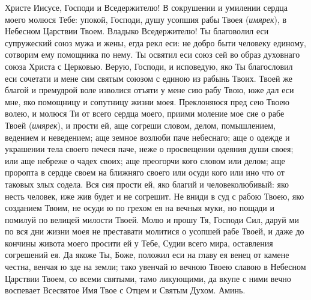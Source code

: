 \begin{mymulticols}
 


Христе Иисусе, Господи и Вседержителю! В сокрушении и умилении сердца моего молюся Тебе: упокой, Господи, душу усопшия рабы Твоея ({\itshape имярек}), в Небесном Царствии Твоем. Владыко Вседержителю! Ты благоволил еси супружеский союз мужа и жены, егда рекл еси: не добро быти человеку единому, сотворим ему помощника по нему. Ты освятил еси союз сей во образ духовнаго союза Христа с Церковью. Верую, Господи, и исповедую, яко Ты благословил еси сочетати и мене сим святым союзом с единою из рабынь Твоих. Твоей же благой и премудрой воле изволися отъяти у мене сию рабу Твою, юже дал еси мне, яко помощницу и сопутницу жизни моея. Преклоняюся пред сею Твоею волею, и молюся Ти от всего сердца моего, приими моление мое сие о рабе Твоей ({\itshape имярек}), и прости ей, аще согреши словом, делом, помышлением, ведением и неведением; аще земное возлюби паче небеснаго; аще о одежде и украшении тела своего печеся паче, неже о просвещении одеяния души своея; или аще небреже о чадех своих; аще преогорчи кого словом или делом; аще проропта в сердце своем на ближняго своего или осуди кого или ино что от таковых злых содела. Вся сия прости ей, яко благий и человеколюбивый: яко несть человек, иже жив будет и не согрешит. Не вниди в суд с рабою Твоею, яко созданием Твоим, не осуди ю по грехом ея на вечныя муки, но пощади и помилуй по велицей милости Твоей. Молю и прошу Тя, Господи Сил, даруй ми по вся дни жизни моея не преставати молитися о усопшей рабе Твоей, и даже до кончины живота моего просити ей у Тебе, Судии всего мира, оставления согрешений ея. Да якоже Ты, Боже, положил еси на главу ея венец от камене честна, венчая ю зде на земли; тако увенчай ю вечною Твоею славою в Небесном Царствии Твоем, со всеми святыми, тамо ликующими, да вкупе с ними вечно воспевает Всесвятое Имя Твое с Отцем и Святым Духом. Аминь. 

\end{mymulticols}

\mychapterending



